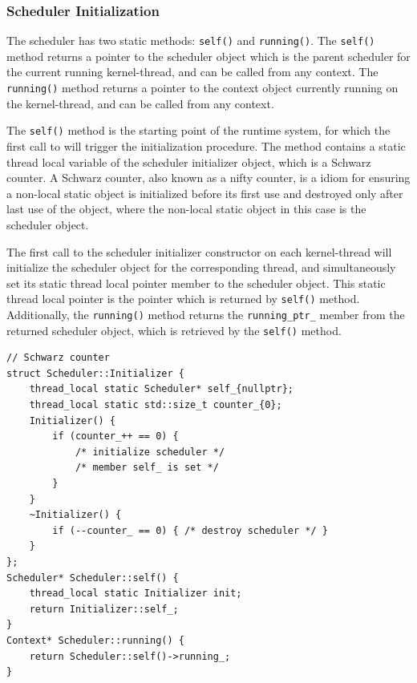 \subsubsection{Scheduler Initialization}


The scheduler has two static methods: \lstinline[style={CustomC++}]|self()| and \lstinline[style={CustomC++}]|running()|. The \lstinline[style={CustomC++}]|self()| method returns a pointer to the scheduler object which is the parent scheduler for the current running kernel\hyp{}thread, and can be called from any context. The \lstinline[style={CustomC++}]|running()| method returns a pointer to the context object currently running on the kernel\hyp{}thread, and can be called from any context.

The \lstinline[style={CustomC++}]|self()| method is the starting point of the runtime system, for which the first call to will trigger the initialization procedure. The method contains a static thread local variable of the scheduler initializer object, which is a Schwarz counter. A Schwarz counter, also known as a nifty counter, is a \Cpp{} idiom for ensuring a non\hyp{}local static object is initialized before its first use and destroyed only after last use of the object, where the non\hyp{}local static object in this case is the scheduler object. 

The first call to the scheduler initializer constructor on each kernel\hyp{}thread will initialize the scheduler object for the corresponding thread, and simultaneously set its static thread local pointer member to the scheduler object. This static thread local pointer is the pointer which is returned by \lstinline[style={CustomC++}]|self()| method. Additionally, the \lstinline[style={CustomC++}]|running()| method returns the \lstinline[style={CustomC++}]|running_ptr_| member from the returned scheduler object, which is retrieved by the \lstinline[style={CustomC++}]|self()| method.

\begin{lstfloat}
\begin{lstlisting}[caption={Static scheduler methods.}, label={lst:static_scheduler_methods}, style={CustomC++}, xleftmargin={2em}]
// Schwarz counter
struct Scheduler::Initializer {
    thread_local static Scheduler* self_{nullptr};
    thread_local static std::size_t counter_{0};
    Initializer() {
        if (counter_++ == 0) { 
            /* initialize scheduler */ 
            /* member self_ is set */
        }
    }
    ~Initializer() {
        if (--counter_ == 0) { /* destroy scheduler */ }
    }
};
Scheduler* Scheduler::self() {
    thread_local static Initializer init;
    return Initializer::self_;
}
Context* Scheduler::running() {
    return Scheduler::self()->running_;
}
\end{lstlisting}
\end{lstfloat}


